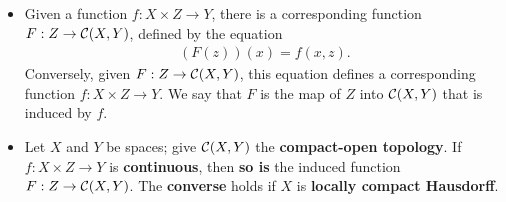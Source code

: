 \documentclass[11pt]{article}
\begin{document}
\begin{itemize}
\item \begin{definition}
Given a function $f : X \times Z \rightarrow Y$, there is a corresponding function $F : Z \rightarrow {\mathcal C}(X, Y)$, defined by the equation
\begin{align*}
(F(z))(x) = f(x, z).
\end{align*}
Conversely, given $F : Z \rightarrow {\mathcal C}(X, Y)$, this equation defines a corresponding function
$f : X \times Z \rightarrow Y$. We say that $F$ is the map of $Z$ into ${\mathcal C}(X, Y)$ that is induced by $f$.
\end{definition}

\item \begin{proposition}
Let $X$ and $Y$ be spaces; give ${\mathcal C}(X, Y)$ the \textbf{compact-open topology}. If $f: X \times Z \rightarrow Y$ is \textbf{continuous}, then \textbf{so is} the induced function $F : Z \rightarrow {\mathcal C}(X, Y)$. The \textbf{converse} holds if $X$ is \textbf{locally compact Hausdorff}.
\end{proposition}
\end{itemize}
\end{document}
